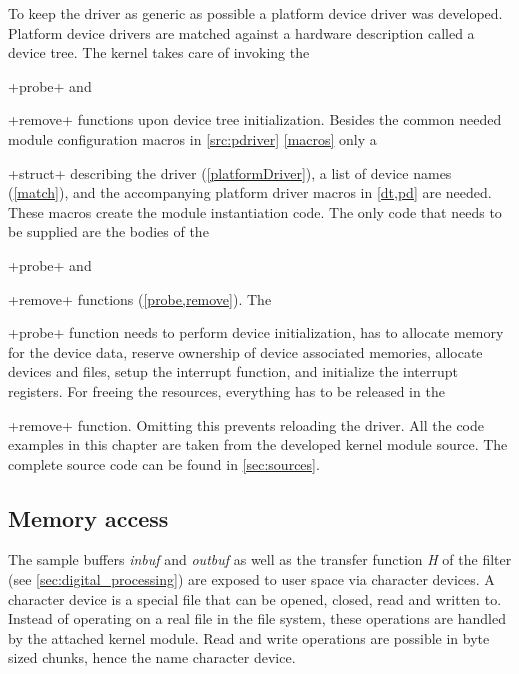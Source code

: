 \documentclass[12pt,a4paper,parskip=full,abstract=true,BCOR=12mm,twoside,open=right]{scrreprt}
\newcommand*{\SavedLstInline}{}
\DeclareRobustCommand*{\lstinline}{%
  \ifmmode
    \let\SavedBGroup\bgroup
    \def\bgroup{%
      \let\bgroup\SavedBGroup
      \hbox\bgroup
    }%
  \fi
  \SavedLstInline
}
\def\device#1{\mbox{\textit{#1}}}
\begin{document}
To keep the driver as generic as possible a platform device driver\cite{platform_device} was
developed. Platform device drivers are matched against a hardware description
called a device tree\cite{platform_device}. The kernel takes care of
invoking the \lstinline+probe+ and \lstinline+remove+ functions upon device tree initialization. Besides
the common needed module configuration macros in \cref{src:pdriver} \cref{macros} only a
\lstinline+struct+ describing the driver (\cref{platformDriver}),
a list of device names (\cref{match}), and the accompanying platform
driver macros in \cref{dt,pd} are needed. These macros create the module
instantiation code. The only code that needs to be supplied are the bodies of
the \lstinline+probe+ and \lstinline+remove+ functions (\cref{probe,remove}). The \lstinline+probe+ function
needs to perform device initialization, has to allocate memory for the
device data, reserve ownership of device associated memories, allocate
devices and files, setup the interrupt function, and initialize the
interrupt registers. For freeing the resources, everything has to be
released in the \lstinline+remove+ function. Omitting this prevents reloading the driver.
All the code examples in this chapter are taken from the developed kernel module source. The
complete source code can be found in \cref{sec:sources}.


\subsection{Memory access}
\label{sec:memory_access}

The sample buffers \device{inbuf} and \device{outbuf} as well as the transfer
function \device{H} of the filter (see \cref{sec:digital_processing}) are
exposed to user space via character devices\cite{ldd}. A character device
is a special file that can be opened, closed, read and written to. Instead of
operating on a real file in the file system, these operations are handled by
the attached kernel module. Read and write operations are possible in byte
sized chunks, hence the name character device.
\end{document}
